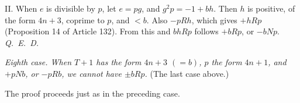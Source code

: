 II. When $e$ is divisible by $p$, let $e=pg$, and $g^2p=-1+bh$. Then $h$ is positive, of the form $4n+3$, coprime to $p$, and $<b$. Also $-pRh$, which gives $+hRp$ (Proposition 14 of Article 132). From this and $bhRp$ follows $+bRp$, or $-bNp$. \mbox{\textit{Q. E. D.}}

\textit{Eighth case. When $T+1$ has the form $4n+3$ $(=b)$, $p$ the form $4n+1$, and $+pNb$, or $-pRb$, we cannot have $\pm bRp$.} (The last case above.)

The proof proceeds just as in the preceding case.
